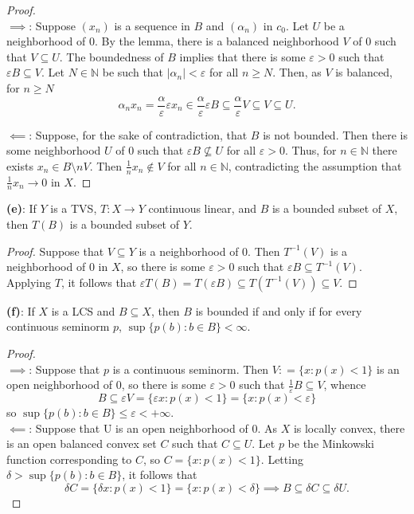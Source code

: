 \documentclass[12pt,letterpaper]{scrartcl}
\newcommand{\sub}{\subseteq}
\newcommand{\N}{\mathbb{N}\xspace}
\newcommand{\eps}{\varepsilon}
\theoremstyle{mystyle}
\theoremstyle{plain}
\theoremstyle{remark}
\begin{document}
  \begin{proof}\ \\
    \underline{$\implies$}: Suppose $(x_n)$ is a sequence in $B$ and $(\alpha_n)$ in $c_0$. Let $U$ be a neighborhood of $0$. By the lemma, there is a balanced neighborhood $V$ of $0$ such that $V\sub U$. The boundedness of $B$ implies that there is some $\eps>0$ such that $\eps B \sub V$. Let $N\in \N$ be such that $|\alpha_n| < \eps$ for all $n\geq N$. Then, as $V$ is balanced, for $n\geq N$
    \[
      \alpha_n x_n = \frac{\alpha}{\eps}\eps x_n \in \frac{\alpha}{\eps}\eps B \sub  \frac{\alpha}{\eps}V \sub V \sub U.
    \]

    \underline{$\impliedby$}: Suppose, for the sake of contradiction, that $B$ is not bounded. Then there is some neighborhood $U$ of $0$ such that $\eps B \not\sub U$ for all $\eps>0$. Thus, for $n\in \N$ there exists $x_n\in B\setminus nV$. Then $\frac{1}{n}x_n\not\in V$ for all $n\in \N$, contradicting the assumption that $\frac{1}{n}x_n\to 0$ in $X$.
  \end{proof}

  \textbf{(e)}: If $Y$ is a TVS, $T:X\to Y$ continuous linear, and $B$ is a bounded subset of $X$, then $T(B)$ is a bounded subset of $Y$.

  \begin{proof}
    Suppose that $V\sub Y$ is a neighborhood of $0$. Then $T^{-1}(V)$ is a neighborhood of $0$ in $X$, so there is some $\eps>0$ such that $\eps B\sub T^{-1}(V)$. Applying $T$, it follows that $\eps T(B) = T(\eps B)\sub T(T^{-1}(V))\sub V$.
  \end{proof}

  \textbf{(f)}: If $X$ is a LCS and $B\sub X$, then $B$ is bounded if and only if for every continuous seminorm $p$, $\sup\{p(b):b\in B\}<\infty$.

  \begin{proof}\ \\
    \underline{$\implies$}: Suppose that $p$ is a continuous seminorm. Then $V : =\{x: p(x)<1\}$ is an open neighborhood of $0$, so there is some $\eps>0$ such that $\frac{1}{\eps}B \sub V$, whence
    \[
      B\sub \eps V  = \{\eps x : p(x)<1\} = \{x: p(x) < \eps\}
    \]
    so $\sup\{p(b):b\in B\}\leq \eps < + \infty$.\\

    \underline{$\impliedby$}: Suppose that U is an open neighborhood of $0$. As $X$ is locally convex, there is an open balanced convex set $C$ such that $C\sub U$. Let $p$ be the Minkowski function corresponding to $C$, so $C = \{x : p(x)<1\}$. Letting $\delta > \sup\{p(b):b\in B\}$, it follows that
    \[
      \delta C = \{\delta x: p(x)< 1\} = \{x: p(x)<\delta\} \implies B\sub \delta C\sub \delta U.
    \]

  \end{proof}
\end{document}
